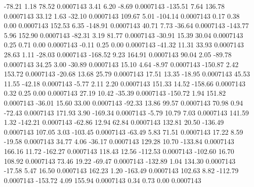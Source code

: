       -78.21        1.18       78.52     0.0007143
        3.41        6.20       -8.69     0.0007143
     -135.51        7.64      136.78     0.0007143
       33.12        1.63      -32.10     0.0007143
      109.67        5.01     -104.14     0.0007143
        0.17        0.38        0.00     0.0007143
      152.53        6.35     -148.91     0.0007143
       40.71        7.73      -36.64     0.0007143
     -143.77        5.96      152.90     0.0007143
      -82.31        3.19       81.77     0.0007143
      -30.91       15.39       30.04     0.0007143
        0.25        0.71        0.00     0.0007143
       -0.11        0.25        0.00     0.0007143
      -41.32       11.31       33.93     0.0007143
       28.63        1.11      -28.03     0.0007143
     -168.52        9.23      164.91     0.0007143
       90.04        2.05      -89.78     0.0007143
       34.25        3.00      -30.89     0.0007143
       15.10        4.64       -8.97     0.0007143
     -150.87        2.42      153.72     0.0007143
      -20.68       13.68       25.79     0.0007143
       17.51       13.35      -18.95     0.0007143
       45.53       11.55      -42.18     0.0007143
       -5.77        2.11        2.20     0.0007143
      151.33       14.52     -158.66     0.0007143
        0.32        0.25        0.00     0.0007143
       27.19       10.42      -35.39     0.0007143
     -150.72        1.94      151.82     0.0007143
      -36.01       15.60       33.00     0.0007143
      -92.33       13.86       99.57     0.0007143
       70.98        0.94      -72.43     0.0007143
      171.93        3.90     -169.34     0.0007143
       -5.79       10.79        7.03     0.0007143
      141.59        1.32     -142.21     0.0007143
      -62.86       12.94       62.84     0.0007143
      132.81       20.50     -136.49     0.0007143
      107.05        3.03     -103.45     0.0007143
      -63.49        5.83       71.51     0.0007143
       17.22        8.59      -19.58     0.0007143
       34.77        4.06      -36.17     0.0007143
      129.28       10.70     -133.84     0.0007143
      166.16       11.72     -162.27     0.0007143
      118.43       12.56     -112.53     0.0007143
     -102.60       16.70      108.92     0.0007143
       73.46       19.22      -69.47     0.0007143
     -132.89        1.04      134.30     0.0007143
      -17.58        5.47       16.50     0.0007143
      162.23        1.20     -163.49     0.0007143
      102.63        8.82     -112.79     0.0007143
     -153.72        4.09      155.94     0.0007143
        0.34        0.73        0.00     0.0007143
